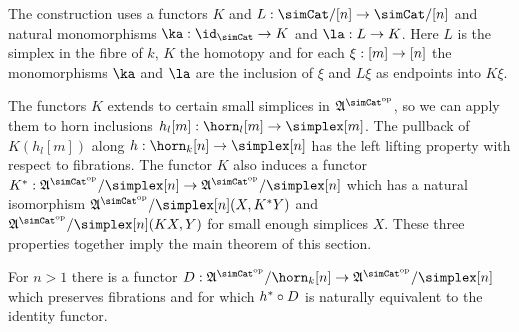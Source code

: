 The construction uses a functors $K$ and $L\of\simCat/[n]\to\simCat/[n]$ and natural monomorphisms $\ka\of \id_{\simCat}\to K$ and $\la \of L\to K$. Here $L$ is the simplex in the fibre of $k$, $K$ the homotopy and for each $\xi:[m]\to[n]$ the monomorphisms $\ka$ and $\la$ are the inclusion of $\xi$ and $L\xi$ as endpoints into $K\xi$.

The functors $K$ extends to certain small simplices in $\ambient\s$, so we can apply them to horn inclusions $h_l[m]\of\horn_l[m]\to\simplex[m]$. %
The pullback of $K(h_l[m])$ along $h\of\horn_k[n]\to\simplex[n]$ has the left lifting property with respect to fibrations. %
The functor $K$ also induces a functor $K\ri\of\ambient\s/\simplex[n]\to\ambient\s/\simplex[n]$ which has a natural isomorphism $\ambient\s/\simplex[n](X,K\ri Y)$ and $\ambient\s/\simplex[n](KX,Y)$ for small enough simplices $X$. %
These three properties together imply the main theorem of this section. %















\begin{theorem} For $n>1$ there is a functor $D\of \ambient\s/\horn_k[n]\to\ambient\s/\simplex[n]$ which preserves fibrations and for which $h^*\circ D$ is naturally equivalent to the identity functor. \end{theorem}


